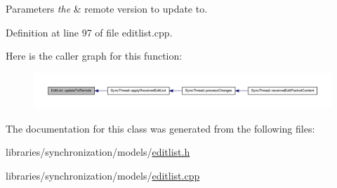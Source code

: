 \begin{DoxyParams}{Parameters}
{\em the} & remote version to update to. \\
\hline
\end{DoxyParams}


Definition at line 97 of file editlist.cpp.



Here is the caller graph for this function:\nopagebreak
\begin{figure}[H]
\begin{center}
\leavevmode
\includegraphics[width=400pt]{class_edit_list_a8e7b3099b3ce693e01b1321b723ec65f_icgraph}
\end{center}
\end{figure}




The documentation for this class was generated from the following files:\begin{DoxyCompactItemize}
\item 
libraries/synchronization/models/\hyperlink{editlist_8h}{editlist.h}\item 
libraries/synchronization/models/\hyperlink{editlist_8cpp}{editlist.cpp}\end{DoxyCompactItemize}
